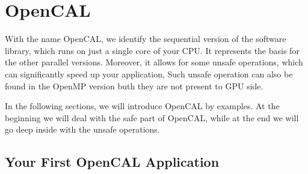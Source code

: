 \chapter{OpenCAL}

With the name OpenCAL, we identify the sequential version of the
software library, which runs on just a single core of your CPU. It
represents the basis for the other parallel versions. Moreover, it
allows for some unsafe operations, which can significantly speed up
your application, Such unsafe operation can also be found in the
OpenMP version buth they are not present to GPU side.

In the following sections, we will introduce OpenCAL by examples. At
the beginning we will deal with the safe part of OpenCAL, while at the
end we will go deep inside with the unsafe operations.

\section{Your First OpenCAL Application}

